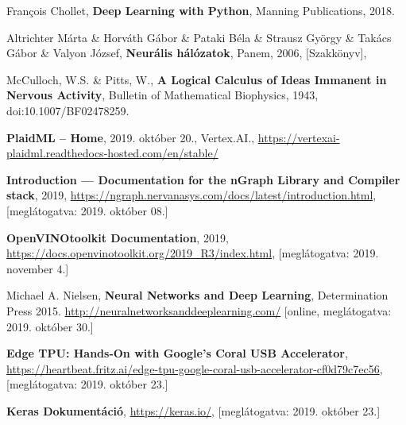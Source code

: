 \begin{thebibliography}{9}
	François Chollet,
	\textbf{Deep Learning with Python},
	Manning Publications,
	2018.

	Altrichter Márta \& Horváth Gábor \& Pataki Béla \& Strausz György \& Takács Gábor \& Valyon József,
	\textbf{Neurális hálózatok},
	Panem,
	2006,
	[Szakkönyv],

McCulloch, W.S. \& Pitts, W.,
\textbf{A Logical Calculus of Ideas Immanent in Nervous Activity},
Bulletin of Mathematical Biophysics,
1943,
doi:10.1007/BF02478259.




\textbf{PlaidML -- Home},
2019. október 20.,
Vertex.AI.,
\newline\url{https://vertexai-plaidml.readthedocs-hosted.com/en/stable/}

\textbf{Introduction --- Documentation for the {nGraph} Library and Compiler stack},
2019,
\newline\url{https://ngraph.nervanasys.com/docs/latest/introduction.html},
[meglátogatva: 2019. október 08.]

\textbf{OpenVINO\textsuperscript{\texttrademark}\space toolkit Documentation},
2019,
\newline\url{https://docs.openvinotoolkit.org/2019_R3/index.html},
[meglátogatva: 2019. november 4.]


	Michael A. Nielsen,
	\textbf{Neural Networks and Deep Learning},
	Determination Press
	2015.
	\newline\url{http://neuralnetworksanddeeplearning.com/}
	[online, meglátogatva: 2019. október 30.]
	
	\textbf{Edge TPU: Hands-On with Google’s Coral USB Accelerator},
	\newline\url{https://heartbeat.fritz.ai/edge-tpu-google-coral-usb-accelerator-cf0d79c7ec56},
	[meglátogatva: 2019. október 23.]
	
	\textbf{Keras Dokumentáció},
	\newline\url{https://keras.io/},
	[meglátogatva: 2019. október 23.]
	

\end{thebibliography}
